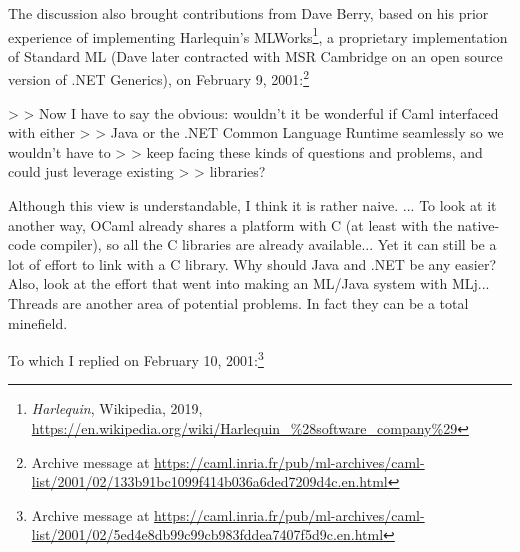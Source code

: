 \documentclass[acmsmall,review]{acmart}\settopmatter{printfolios=true,printccs=false,printacmref=false}
\begin{document}
The discussion also brought contributions from Dave Berry, based on his prior experience of implementing Harlequin’s MLWorks\footnote{\textit{Harlequin}, Wikipedia, 2019, \url{https://en.wikipedia.org/wiki/Harlequin_\%28software_company\%29}}, a proprietary implementation of Standard ML (Dave later contracted with MSR Cambridge on an open source version of .NET Generics), on February 9, 2001:\footnote{Archive message at \url{https://caml.inria.fr/pub/ml-archives/caml-list/2001/02/133b91bc1099f414b036a6ded7209d4c.en.html}}
\begin{verbquote}
> > Now I have to say the obvious: wouldn't it be wonderful if Caml interfaced with either 
> > Java or the .NET Common Language Runtime seamlessly so we wouldn't have to 
> > keep facing these kinds of questions and problems, and could just leverage existing 
> > libraries?   

Although this view is understandable, I think it is rather naive. ... To look at it another way, OCaml already shares a platform with C (at least with the native-code compiler), so all the C libraries are already available... Yet it can still be a lot of effort to link with a C library.  Why should Java and .NET be any easier?  Also, look at the effort that went into making an ML/Java system with MLj... Threads are another area of potential problems.  In fact they can be a total minefield.
\end{verbquote}
To which I replied on February 10, 2001:\footnote{Archive message at \url{https://caml.inria.fr/pub/ml-archives/caml-list/2001/02/5ed4e8db99c99cb983fddea7407f5d9c.en.html}}
\end{document}
